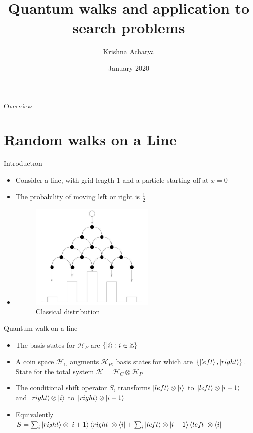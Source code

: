 \documentclass[10pt]{beamer}
\title{Quantum walks and application to search problems}
\author{Krishna Acharya}
\date{January 2020}
\newcommand{\Hi}{\mathcal{H}}
\begin{document}
\maketitle

\begin{frame}{Overview}
\tableofcontents
\end{frame}

\section{Random walks on a Line}
\begin{frame}{Introduction}
    \begin{itemize}
        \item Consider a line, with grid-length $1$ and a particle starting off at $x=0$
        \item The probability of moving left or right is $\frac{1}{2}$
        \item  
         \begin{figure}[H]
         \centering
         \includegraphics[width=60mm]{Images/Galton.JPG}
         \caption{Classical distribution}
        \end{figure}
    \end{itemize}
\end{frame}
\begin{frame}{Quantum walk on a line}
    \begin{itemize}
        \item The basis states for $\Hi_P$  are $\{\ket{i}: i\in \mathbb{Z}\}$
        \item A coin space $\Hi_C$ augments $\Hi_P$, basis states for which are $\{\ket{left}, \ket{right} \}$. State for the total system $\Hi = \Hi_C \otimes \Hi_P$
        \item The conditional shift operator $S$, transforms $\ket{left} \otimes \ket{i}$ to  $\ket{left} \otimes \ket{i-1}$ and $\ket{right} \otimes \ket{i}$ to  $\ket{right} \otimes \ket{i+1}$
        \item Equivalently $S = \sum_i{\ket{right} \otimes \ket{i+1} \bra{right}\otimes\bra{i}} + \sum_i{\ket{left} \otimes \ket{i-1} \bra{left}\otimes\bra{i}}$
    \end{itemize}
\end{frame}
\end{document}
